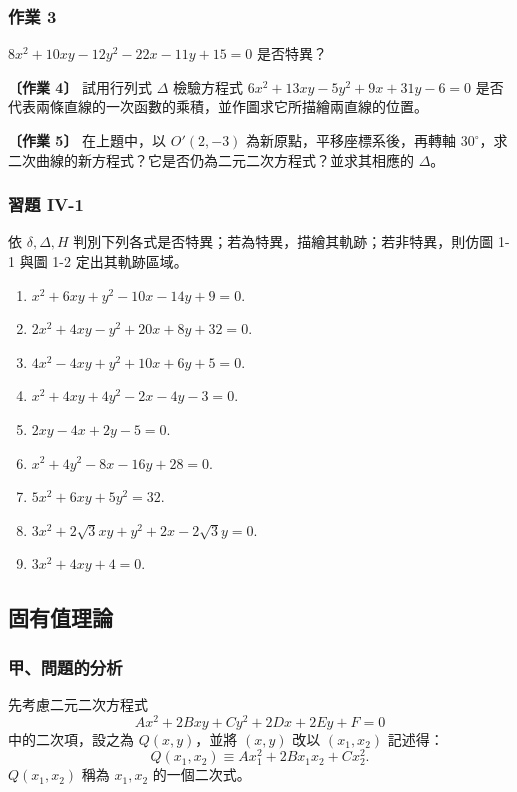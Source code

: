 \subsubsection*{作業 3}
$8x^2 + 10xy - 12y^2 - 22x - 11y + 15 = 0$ 是否特異？

\textbf{〔作業 4〕} 試用行列式 $\Delta$ 檢驗方程式 $6x^2 + 13xy - 5y^2 + 9x + 31y - 6 = 0$ 是否代表兩條直線的一次函數的乘積，並作圖求它所描繪兩直線的位置。

\textbf{〔作業 5〕} 在上題中，以 $O'(2, -3)$ 為新原點，平移座標系後，再轉軸 $30^\circ$，求二次曲線的新方程式？它是否仍為二元二次方程式？並求其相應的 $\Delta$。

\subsubsection*{習題 IV-1}

依 $\delta, \Delta, H$ 判別下列各式是否特異；若為特異，描繪其軌跡；若非特異，則仿圖 1-1 與圖 1-2 定出其軌跡區域。

\begin{enumerate}
  \item $x^2 + 6xy + y^2 - 10x - 14y + 9 = 0$.
  \item $2x^2 + 4xy - y^2 + 20x + 8y + 32 = 0$.
  \item $4x^2 - 4xy + y^2 + 10x + 6y + 5 = 0$.
  \item $x^2 + 4xy + 4y^2 - 2x - 4y - 3 = 0$.
  \item $2xy - 4x + 2y - 5 = 0$.
  \item $x^2 + 4y^2 - 8x - 16y + 28 = 0$.
  \item $5x^2 + 6xy + 5y^2 = 32$.
  \item $3x^2 + 2\sqrt{3}xy + y^2 + 2x - 2\sqrt{3}y = 0$.
  \item $3x^2 + 4xy + 4 = 0$.
\end{enumerate}


\subsection{固有值理論}\label{sec:b4s-4-2}

\subsubsection*{甲、\quad 問題的分析}

先考慮二元二次方程式
\[
Ax^2 + 2Bxy + Cy^2 + 2Dx + 2Ey + F = 0
\]
中的二次項，設之為 $Q(x, y)$，並將 $(x, y)$ 改以 $(x_1, x_2)$ 記述得：
\[
Q(x_1, x_2) \equiv Ax_1^2 + 2Bx_1 x_2 + Cx_2^2.
\]
$Q(x_1, x_2)$ 稱為 $x_1, x_2$ 的一個二次式。

